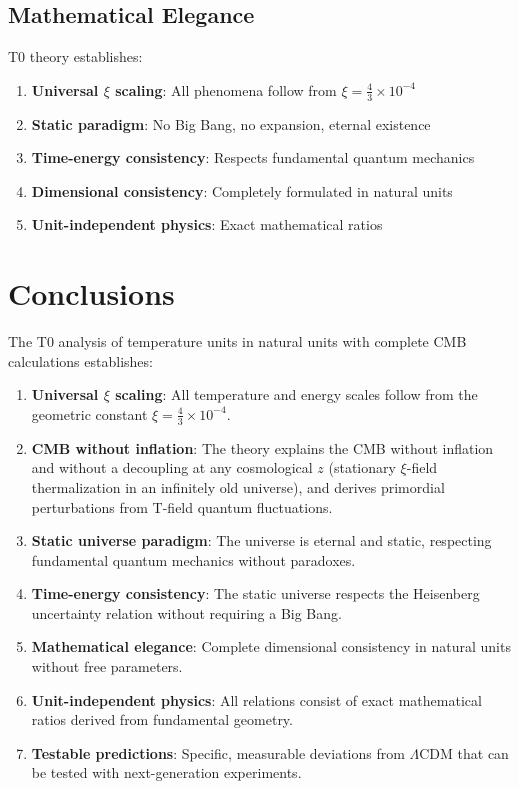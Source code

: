 	\subsection{Mathematical Elegance}
	
	T0 theory establishes:
	\begin{enumerate}
		\item \textbf{Universal $\xi$ scaling}: All phenomena follow from $\xi = \frac{4}{3} \times 10^{-4}$
		\item \textbf{Static paradigm}: No Big Bang, no expansion, eternal existence
		\item \textbf{Time-energy consistency}: Respects fundamental quantum mechanics
		\item \textbf{Dimensional consistency}: Completely formulated in natural units
		\item \textbf{Unit-independent physics}: Exact mathematical ratios
	\end{enumerate}
	
	\section{Conclusions}
	
	The T0 analysis of temperature units in natural units with complete CMB calculations establishes:
	
	\begin{enumerate}
		\item \textbf{Universal $\xi$ scaling}: All temperature and energy scales follow from the geometric constant $\xi = \frac{4}{3} \times 10^{-4}$.
		
		\item \textbf{CMB without inflation}: The theory explains the CMB without inflation and without a decoupling at any cosmological $z$ (stationary $\xi$-field thermalization in an infinitely old universe), and derives primordial perturbations from T-field quantum fluctuations.
		
		\item \textbf{Static universe paradigm}: The universe is eternal and static, respecting fundamental quantum mechanics without paradoxes.
		
		\item \textbf{Time-energy consistency}: The static universe respects the Heisenberg uncertainty relation without requiring a Big Bang.
		
		\item \textbf{Mathematical elegance}: Complete dimensional consistency in natural units without free parameters.
		
		\item \textbf{Unit-independent physics}: All relations consist of exact mathematical ratios derived from fundamental geometry.
		
		\item \textbf{Testable predictions}: Specific, measurable deviations from $\Lambda$CDM that can be tested with next-generation experiments.
	\end{enumerate}
	
